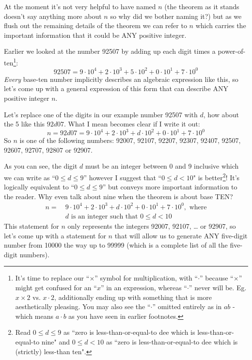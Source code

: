 \documentclass{article}
\begin{document}
At the moment it's not very helpful to have named $n$ (the theorem as it stands
doesn't say anything more about $n$ so why did we bother naming it?) but
as we flush out the remaining details of the theorem
we can refer to $n$ which carries the important information that it could be ANY positive integer.

Earlier we looked at the number 92507 by adding up
each digit times a power-of-ten\footnote{It's time
to replace our ``$\times{}$'' symbol for multiplication, with ``$\cdot{}$''
because ``$\times{}$'' might get confused for an ``$x$'' in an expression,
whereas ``$\cdot{}$'' never will be. Eg. $x\times{}2$
vs. $x\cdot{}2$, additionally ending up with something that is more aesthetically pleasing.
You may also see the ``$\cdot$'' omitted entirely as
in $ab$ - which means $a\cdot{}b$ as you have seen in earlier footnotes.}:
\[92507=9{\cdot}10^4+2{\cdot}10^3+5{\cdot}10^2+0{\cdot}10^1+7{\cdot}10^0\]
\emph{Every} base-ten number implicitly describes an algebraic expression like this, so
let's come up
with a general expression of this form that can describe ANY positive integer $n$.

Let's replace one of the digits in our example number 92507 with $d$, how about the 5 like this $92d07$. What I
mean becomes clear if I write it out:
\[n=92d07=9{\cdot}10^4+2{\cdot}10^3+d{\cdot}10^2+0{\cdot}10^1+7{\cdot}10^0\]
So $n$ is one of the following numbers:
92007,
92107,
92207,
92307,
92407,
92507,
92607,
92707,
92807 or
92907.

As you can see, the digit $d$ must be an integer between 0 and 9 inclusive 
which we can write as ``$0\le{}d\le{}9$'' however I suggest that ``$0\le{}d<10$" is better\footnote{Read 
$0\le{}d\le{}9$ as ``zero is less-than-or-equal-to dee which is less-than-or-equal-to nine"
and $0\le{}d<10$ as ``zero is less-than-or-equal-to dee which is (strictly) less-than ten".}!
It's logically equivalent to ``$0\le{}d\le{}9$''  but conveys more important information
to the reader. Why even talk about nine when the theorem is about base TEN?
\begin{align*}
n =\ &9{\cdot}10^4+2{\cdot}10^3+d{\cdot}10^2+0{\cdot}10^1+7{\cdot}10^0,\text{ where}\\
&d\text{ is an integer such that }0\le{}d<10
\end{align*}
This statement for $n$ only represents the integers 92007, 92107, \dots{} or 92907, so let's come up
with a statement for $n$ that will allow us to generate ANY five-digit number from 10000 
the way up to 99999 (which is a complete list of all the five-digit numbers).
\end{document}
